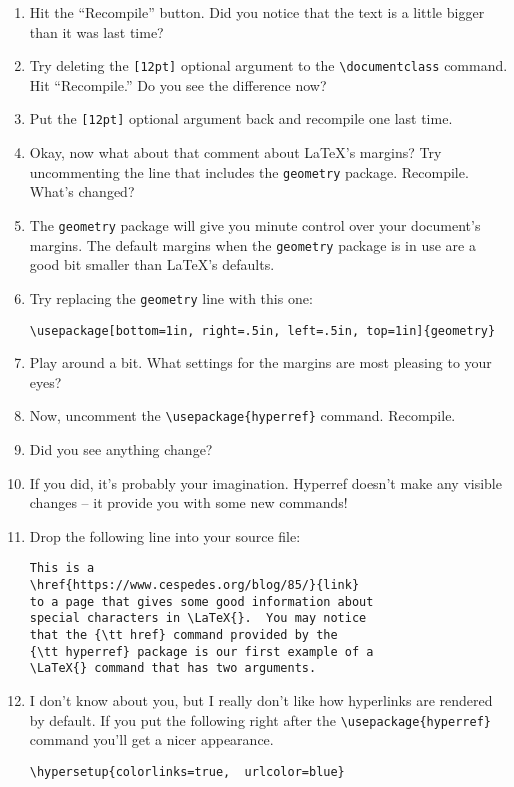 \begin{enumerate}
	\item Hit the ``Recompile'' button.  Did you notice that the text is a little bigger than it was last time?
	\item Try deleting the \verb+[12pt]+ optional argument to the \verb+\documentclass+ command.  Hit ``Recompile.'' Do you see the difference now?  
	\item Put the \verb+[12pt]+ optional argument back and recompile one last time.
	\item Okay, now what about that comment about \LaTeX{}'s margins?  Try uncommenting the line that includes the {\tt geometry} package.
	Recompile.  What's changed?
	\item The {\tt geometry} package will give you minute control over your document's margins.  The default margins when the {\tt geometry} package is in use are a good bit smaller than \LaTeX{}'s defaults.
	\item Try replacing the {\tt geometry} line with this one:
\medskip

\begin{codeblock}
\begin{verbatim}
\usepackage[bottom=1in, right=.5in, left=.5in, top=1in]{geometry}
\end{verbatim}
\end{codeblock}
\medskip

    \item Play around a bit.  What settings for the margins are most pleasing to your eyes?
    \item Now, uncomment the \verb+\usepackage{hyperref}+ command.  Recompile.
    \item Did you see anything change?
    \item If you did, it's probably your imagination. Hyperref doesn't make any visible changes -- it provide you with some new commands!
    \item Drop the following line into your source file:
\medskip

\begin{codeblock}
\begin{verbatim}
This is a 
\href{https://www.cespedes.org/blog/85/}{link} 
to a page that gives some good information about 
special characters in \LaTeX{}.  You may notice 
that the {\tt href} command provided by the 
{\tt hyperref} package is our first example of a 
\LaTeX{} command that has two arguments.
\end{verbatim}
\end{codeblock}
\medskip

	\item I don't know about you, but I really don't like how hyperlinks are rendered by default.  If you put the following right after the \verb+\usepackage{hyperref}+ command you'll get a nicer appearance.
\medskip

\begin{codeblock}
\begin{verbatim}
\hypersetup{colorlinks=true,  urlcolor=blue}
\end{verbatim}
\end{codeblock}
\medskip


\end{enumerate}
